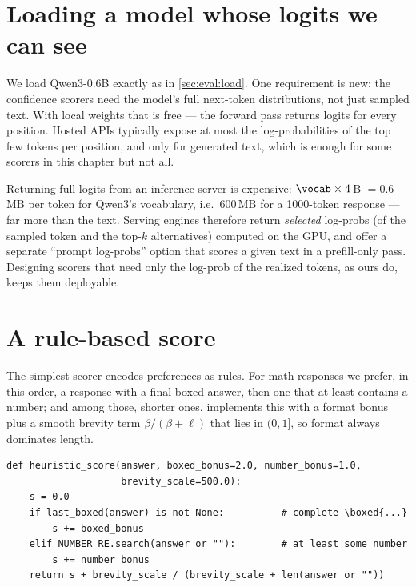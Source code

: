 \section{Loading a model whose logits we can see}\label{sec:refine:load}


We load Qwen3-0.6B exactly as in \cref{sec:eval:load}. One requirement is new: the confidence scorers
need the model's full next-token distributions, not just sampled text. With local weights that is
free --- the forward pass returns logits for every position. Hosted APIs typically expose at most the
log-probabilities of the top few tokens per position, and only for generated text, which is enough
for some scorers in this chapter but not all.

\begin{systemslens}
Returning full logits from an inference server is expensive: $\vocab \times 4$\,B $= 0.6$\,MB per
token for Qwen3's vocabulary, i.e.\ 600\,MB for a 1000-token response --- far more than the text.
Serving engines therefore return \emph{selected} log-probs (of the sampled token and the top-$k$
alternatives) computed on the GPU, and offer a separate ``prompt log-probs'' option that scores a
given text in a prefill-only pass. Designing scorers that need only the log-prob of the realized
tokens, as ours do, keeps them deployable.
\end{systemslens}

\section{A rule-based score}\label{sec:refine:rule}


The simplest scorer encodes preferences as rules. For math responses we prefer, in this order, a
response with a final boxed answer, then one that at least contains a number; and among those, shorter
ones.  implements this with a format bonus plus a smooth brevity term
$\beta/(\beta + \ell)$ that lies in $(0, 1]$, so format always dominates length.

\begin{lstlisting}[caption={A rule-based scorer for format and brevity (\texttt{llmsys/tts.py}).},label={lst:refine:heuristic}]
def heuristic_score(answer, boxed_bonus=2.0, number_bonus=1.0,
                    brevity_scale=500.0):
    s = 0.0
    if last_boxed(answer) is not None:          # complete \boxed{...}
        s += boxed_bonus
    elif NUMBER_RE.search(answer or ""):        # at least some number
        s += number_bonus
    return s + brevity_scale / (brevity_scale + len(answer or ""))
\end{lstlisting}

